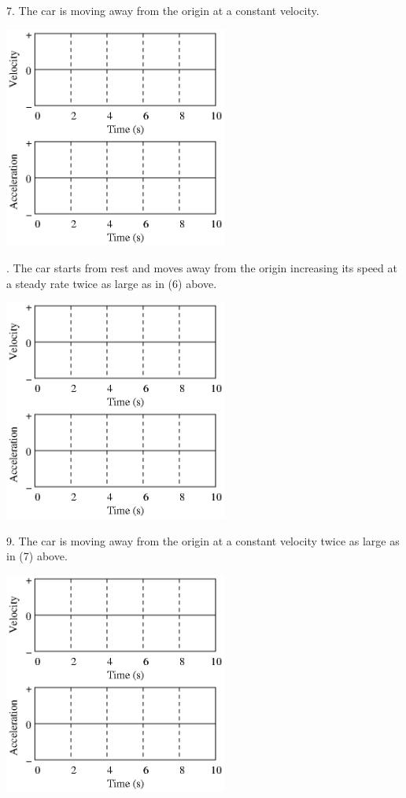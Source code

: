7. The car is moving away from the origin at a constant velocity.

\vspace{0.3cm}
{\par\centering \includegraphics[width=0.55\textwidth]{changing/changing_fig12.eps} \par}
\answerspace{0.3cm}

. The car starts from rest and moves away from the origin increasing its speed
at a steady rate twice as large as in (6) above.

\vspace{0.3cm}
{\par\centering \includegraphics[width=0.55\textwidth]{changing/changing_fig12.eps} \par}
\vspace{0.3cm}

9. The car is moving away from the origin at a constant velocity twice as large
as in (7) above.

\vspace{0.3cm}
{\par\centering \includegraphics[width=0.55\textwidth]{changing/changing_fig12.eps} \par}
\vspace{0.3cm}

